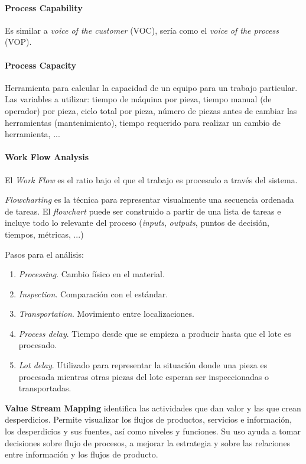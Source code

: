 \documentclass[oneside]{book}
\begin{document}
\paragraph{Process Capability}
Es similar a \textit{voice of the customer} (VOC), sería como el \textit{voice of the process} (VOP).

\paragraph{Process Capacity}
Herramienta para calcular la capacidad de un equipo para un trabajo particular. Las variables a utilizar: tiempo de máquina por pieza, tiempo manual (de operador) por pieza, ciclo total por pieza, número de piezas antes de cambiar las herramientas (mantenimiento), tiempo requerido para realizar un cambio de herramienta, ...

\paragraph{Work Flow Analysis}
El \textit{Work Flow} es el ratio bajo el que el trabajo es procesado a través del sistema.

\textit{Flowcharting} es la técnica para representar visualmente una secuencia ordenada de tareas. El \textit{flowchart} puede ser construido a partir de una lista de tareas e incluye todo lo relevante del proceso (\textit{inputs}, \textit{outputs}, puntos de decisión, tiempos, métricas, ...)

Pasos para el análisis:
\begin{enumerate}
	\item \textit{Processing}. Cambio físico en el material.
	\item \textit{Inspection}. Comparación con el estándar.
	\item \textit{Transportation}. Movimiento entre localizaciones.
	\item \textit{Process delay}. Tiempo desde que se empieza a producir hasta que el lote es procesado.
	\item \textit{Lot delay}. Utilizado para representar la situación donde una pieza es procesada mientras otras piezas del lote esperan ser inspeccionadas o transportadas.
\end{enumerate}

\textbf{Value Stream Mapping} identifica las actividades que dan valor y las que crean desperdicios. Permite visualizar los flujos de productos, servicios e información, los desperdicios y sus fuentes, así como niveles y funciones. Su uso ayuda a tomar decisiones sobre flujo de procesos, a mejorar la estrategia y sobre las relaciones entre información y los flujos de producto.
\end{document}

